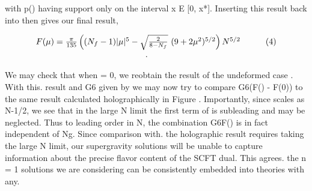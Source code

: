 \documentclass{article}
\begin{document}
with p() having support only on the interval x E [0, x*]. Inserting this result back into then
gives our final result,


\begin{equation}
\begin{array} { c c } { F ( \mu ) = \frac { \pi } { 1 3 5 } \left ( ( N _ { f } - 1 ) | \mu | ^ { 5 } - \sqrt { \frac { 2 } { 8 - N _ { f } } } ~ ( 9 + 2 \mu ^ { 2 } ) ^ { 5 / 2 } \right ) N ^ { 5 / 2 } \qquad } & { ( 4 ) } \\ {. } \end{array}
\end{equation}


We may check that when  = 0, we reobtain the result of the undeformed case . With this.
result and G6 given by we may now try to compare G6(F() - F(0)) to the same result
calculated holographically in Figure . Importantly, since  scales as N-1/2, we see that in
the large N limit the first term of is subleading and may be neglected. Thus to leading
order in N, the combination G6F() is in fact independent of Ng. Since comparison with.
the holographic result requires taking the large N limit, our supergravity solutions will be
unable to capture information about the precise flavor content of the SCFT dual. This agrees.
the n = 1 solutions we are considering can be consistently embedded into theories with any.
\end{document}
